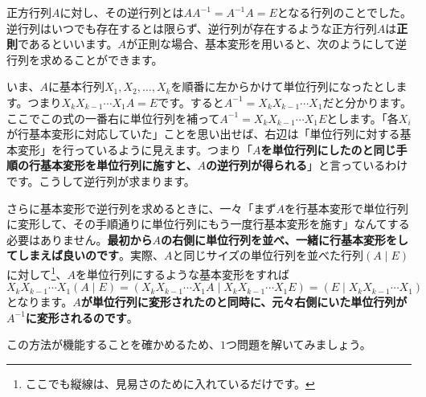 正方行列$A$に対し、その逆行列とは$AA^{-1} = A^{-1}A = E$となる行列のことでした。逆行列はいつでも存在するとは限らず、逆行列が存在するような正方行列$A$は\textbf{正則}であるといいます。$A$が正則な場合、基本変形を用いると、次のようにして逆行列を求めることができます。

いま、$A$に基本行列$X_1, X_2, \ldots, X_k$を順番に左からかけて単位行列になったとします。つまり$X_k X_{k-1} \cdots X_1 A = E$です。すると$A^{-1} = X_k X_{k-1} \cdots X_1$だと分かります。ここでこの式の一番右に単位行列を補って$A^{-1} = X_k X_{k-1} \cdots X_1 E$とします。「各$X_i$が行基本変形に対応していた」ことを思い出せば、右辺は「単位行列に対する基本変形」を行っているように見えます。つまり「\textbf{$A$を単位行列にしたのと同じ手順の行基本変形を単位行列に施すと、$A$の逆行列が得られる}」と言っているわけです。こうして逆行列が求まります。

さらに基本変形で逆行列を求めるときに、一々「まず$A$を行基本変形で単位行列に変形して、その手順通りに単位行列にもう一度行基本変形を施す」なんてする必要はありません。\textbf{最初から$A$の右側に単位行列を並べ、一緒に行基本変形をしてしまえば良いのです}。実際、$A$と同じサイズの単位行列を並べた行列$(A \mid E)$に対して\footnote{ここでも縦線は、見易さのために入れているだけです。}、$A$を単位行列にするような基本変形をすれば
\[
X_k X_{k-1} \cdots X_1 (A \mid E) = (X_k X_{k-1} \cdots X_1 A \mid X_k X_{k-1} \cdots X_1 E) = (E \mid X_k X_{k-1} \cdots X_1)
\]
となります。\textbf{$A$が単位行列に変形されたのと同時に、元々右側にいた単位行列が$A^{-1}$に変形されるのです}。

この方法が機能することを確かめるため、$1$つ問題を解いてみましょう。

